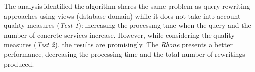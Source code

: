 The analysis identified the algorithm shares the same problem as query rewriting approaches using views
(database domain) while it does not take into account quality measures (\textit{Test 1}): 
increasing the processing time when the query and the number of concrete services increase. 
However, while considering the quality measures (\textit{Test 2}), the results are promisingly.  
The \textit{Rhone} presents a better performance, decreasing the processing time and 
the total number of rewritings produced.  



